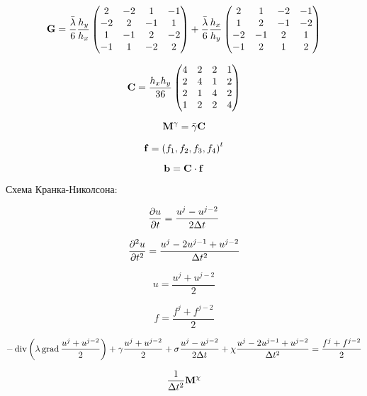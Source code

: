 $$ \mathbf{G} = \frac{\bar{\lambda}}{6}\frac{h_y}{h_x}\begin{pmatrix}
2 & -2 & 1 & -1 \\
-2 & 2 & -1 & 1 \\
1 & -1 & 2 & -2 \\
-1 & 1 & -2 & 2
\end{pmatrix} + \frac{\bar{\lambda}}{6}\frac{h_x}{h_y}\begin{pmatrix}
2 & 1 & -2 & -1 \\
1 & 2 & -1 & -2 \\
-2 & -1 & 2 & 1 \\
-1 & 2 & 1 & 2
\end{pmatrix} $$

$$ \mathbf{C} = \frac{h_x h_y}{36}\begin{pmatrix}
4 & 2 & 2 & 1 \\
2 & 4 & 1 & 2 \\
2 & 1 & 4 & 2 \\
1 & 2 & 2 & 4
\end{pmatrix} $$

$$ \mathbf{M}^\gamma = \bar{\gamma}\mathbf{C} $$

$$ \mathbf{f} = \left(f_1, f_2, f_3, f_4\right)^t $$

$$ \mathbf{b} = \mathbf{C}\cdot \mathbf{f} $$




Схема Кранка-Николсона:

$$ \frac{\partial u}{\partial t} = \frac{u^j-u^{j-2}}{2\Delta t} $$

$$ \frac{\partial^{2} u}{\partial t^{2}} = \frac{u^j-2u^{j-1}+u^{j-2}}{\Delta t^2} $$

$$ u = \frac{u^j+u^{j-2}}{2} $$

$$ f = \frac{f^j+f^{j-2}}{2} $$

$$ -\operatorname{div}\left(\lambda \operatorname{grad}\frac{u^j+u^{j-2}}{2}\right) + \gamma \frac{u^j+u^{j-2}}{2} + \sigma \frac{u^j - u^{j-2}}{2\Delta t} + \chi \frac{u^j-2u^{j-1}+u^{j-2}}{\Delta t^2} = \frac{f^j+f^{j-2}}{2} $$

$$ \frac{1}{\Delta t^2} \mathbf{M}^\chi \mathbf{} $$

